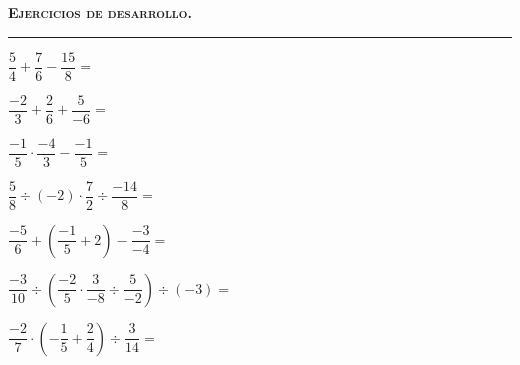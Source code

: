 \documentclass[spanish,letterpaper, 12pt, addpoints, answers]{exam}
\begin{document}
\parbox{16cm}{
{\textsc{\textbf{Ejercicios de desarrollo.}}}}

\vspace{0.15in}
\hrule 
\begin{questions}


\question[3]  $\dfrac{5}{4}+ \dfrac{7}{6}- \dfrac{15}{8} =$\\
\vspace{3cm}

\question[3]  $\dfrac{-2}{3}+ \dfrac{2}{6} + \dfrac{5}{-6}=$\\
\vspace{4cm}

\question[3]  $\dfrac{-1}{5}\cdot \dfrac{-4}{3}-\dfrac{-1}{5}=$\\
\vspace{4cm}

\question[3]  $\dfrac{5}{8}\div (-2)\cdot \dfrac{7}{2}\div \dfrac{-14}{8}=$\\
\vspace{4.5cm}

\question[3]  $\dfrac{-5}{6}+\left(\dfrac{-1}{5}+2\right)-\dfrac{-3}{-4}=$\\
\vspace{4.5cm}

\question[3]  $\dfrac{-3}{10}\div\left(\dfrac{-2}{5}\cdot\dfrac{3}{-8}\div\dfrac{5}{-2}\right)\div (-3)=$\\
\vspace{4.55cm}

\question[3]  $\dfrac{-2}{7}\cdot \left(-\dfrac{1}{5}+\dfrac{2}{4}\right)\div\dfrac{3}{14}=$\\
\vspace{6cm}

\end{questions}
\end{document}
